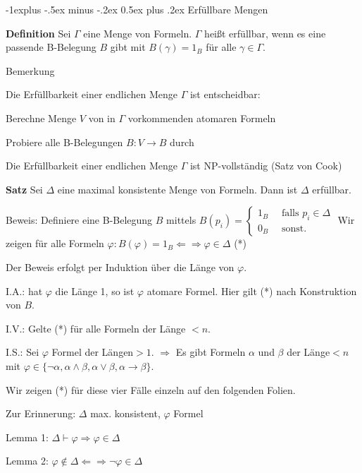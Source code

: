 \documentclass[a4paper]{article}
\makeatletter
\renewcommand{\note}[2]{\begin{noteBox} \textbf{#1} #2 \end{noteBox}}
\renewcommand{\subsection}{\@startsection{subsection}{2}{0mm}%
                {-1explus -.5ex minus -.2ex}%
                {0.5ex plus .2ex}%
                {\normalfont\normalsize\bfseries}}
\makeatother
\begin{document}
\begin{multicols}{3}
  \subsection{Erfüllbare Mengen}

  \note{Definition}{Sei $\Gamma$ eine Menge von Formeln. $\Gamma$ heißt erfüllbar, wenn es eine passende B-Belegung $B$ gibt mit $B(\gamma) = 1_B$ für alle $\gamma\in\Gamma$.}

  Bemerkung
  \begin{itemize*}
    \item Die Erfüllbarkeit einer endlichen Menge $\Gamma$ ist entscheidbar:
    \begin{itemize*}
      \item Berechne Menge $V$ von in $\Gamma$ vorkommenden atomaren Formeln
      \item Probiere alle B-Belegungen $B:V\rightarrow B$ durch
    \end{itemize*}
    \item Die Erfüllbarkeit einer endlichen Menge $\Gamma$ ist NP-vollständig (Satz von Cook)
  \end{itemize*}

  \note{Satz}{Sei $\Delta$  eine maximal konsistente Menge von Formeln. Dann ist $\Delta$ erfüllbar.}

  Beweis: Definiere eine B-Belegung $B$ mittels $B(p_i) = \begin{cases} 1_B \quad\text{ falls } p_i\in\Delta \\ 0_B \quad\text{ sonst. } \end{cases}$
  Wir zeigen für alle Formeln $\varphi: B(\varphi) = 1_B \Leftarrow\Rightarrow\varphi\in\Delta$ (*)

  Der Beweis erfolgt per Induktion über die Länge von $\varphi$.

  \begin{enumerate*}
    \item I.A.: hat $\varphi$ die Länge 1, so ist $\varphi$ atomare Formel. Hier gilt (*) nach Konstruktion von $B$.
    \item I.V.: Gelte (*) für alle Formeln der Länge $<n$.
    \item I.S.: Sei $\varphi$ Formel der Längen$>1$. $\Rightarrow$ Es gibt Formeln $\alpha$ und $\beta$ der Länge$<n$ mit $\varphi\in\{\lnot\alpha,\alpha\wedge\beta,\alpha\vee\beta,\alpha\rightarrow\beta\}$.
  \end{enumerate*}
  \begin{itemize*}
    \item Wir zeigen (*) für diese vier Fälle einzeln auf den folgenden Folien.
    \item Zur Erinnerung: $\Delta$ max. konsistent, $\varphi$ Formel
    \begin{itemize*}
      \item Lemma 1: $\Delta\vdash\varphi\Rightarrow\varphi\in\Delta$
      \item Lemma 2: $\varphi\not\in\Delta\Leftarrow\Rightarrow\lnot\varphi\in\Delta$
    \end{itemize*}
  \end{itemize*}


\end{multicols}
\end{document}
